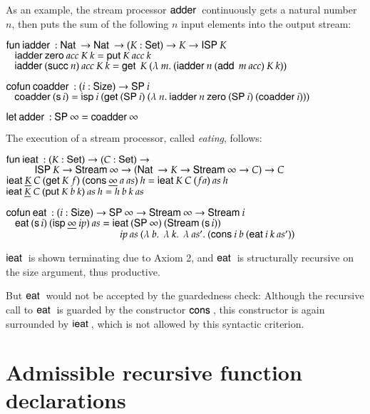 As an example, the stream processor $\mathsf{adder}\:$ continuously gets a natural number $n$, 
then puts the sum of the following $n$ input elements into the output stream:
\begin{bsp}
$\mathsf{fun}\: \mathsf{iadder}\: : \mathsf{Nat}\: \rightarrow \mathsf{Nat}\: \rightarrow (K : \mathsf{Set} ) \rightarrow K \rightarrow \mathsf{ISP}\: K$\\
$\hspace*{3mm} \mathsf{iadder}\: \mathsf{zero}\: acc \: K \: k = \mathsf{put}\: K \: acc \: k$\\
$\hspace*{3mm} \mathsf{iadder}\: (\mathsf{succ}\: n) \: acc \: K \: k = \mathsf{get}\: \: K \: (\lambda\: m .\: (\mathsf{iadder}\: n \: (\mathsf{add}\: \: m \: acc) \: K \: k))$

$\mathsf{cofun}\: \mathsf{coadder}\: : (i : \mathsf{Size} ) \rightarrow \mathsf{SP}\: i$\\
$\hspace*{3mm} \mathsf{coadder}\: (\mathsf{s}\, i) = \mathsf{isp}\: i \: (\mathsf{get}\: (\mathsf{SP}\: i) \: (\lambda\: n .\: \mathsf{iadder}\: n \: \mathsf{zero}\: (\mathsf{SP}\: i) \: (\mathsf{coadder}\: i)))$

$\mathsf{let}\: \mathsf{adder}\: : \mathsf{SP}\: \infty = \mathsf{coadder}\: \infty$
\end{bsp}
\noindent The execution of a stream processor, called \emph{eating}, follows:
\begin{bsp}
$\mathsf{fun}\: \mathsf{ieat}\: : (K : \mathsf{Set}) \rightarrow (C : \mathsf{Set}) \rightarrow $\\
$ \spcx \ispd K \ra \SStream \infty \ra (\Nat \ra K \ra \SStream \infty \ra C) \ra C$ \\
$ \mathsf{ieat}\: \underline{K} \: C \: (\mathsf{get}\: K \: f) \: (\mathsf{cons}\: \underline{\infty} \: a \: as) \: h = \mathsf{ieat}\: K \: C \: (f a) \: as \: h $ \\
$ \mathsf{ieat}\: \underline{K} \: C \: (\mathsf{put}\: K \: b \:k) \: as  \: h = h \: b \: k \: as $

$\mathsf{cofun}\: \mathsf{eat}\: : (i : \mathsf{Size}) \rightarrow \mathsf{SP}\: \infty \rightarrow \mathsf{Stream}\: \infty \rightarrow \mathsf{Stream}\: i$\\
$\hspace*{3mm} \mathsf{eat}\: (\mathsf{s}\, i) \: (\mathsf{isp}\: \underline{\infty} \: ip) \: as = \mathsf{ieat}\: (\mathsf{SP}\: \infty) \: (\mathsf{Stream}\: (\mathsf{s}\, i))$\\
$\spcx \spcx \spcx  \spcx ip \: as \: (\lam{b} \: \lam{k} \: \lam{as'} (\cons i \: b \: (\eat i \: k \: as'))$   
\end{bsp}
\noindent $\mathsf{ieat}\:$ is shown terminating due to Axiom 2, and $\mathsf{eat}\:$ is structurally recursive on the size argument, thus productive.

But $\mathsf{eat}\:$ would not be accepted by the guardedness check: Although the recursive call to $\mathsf{eat}\:$ is guarded by the constructor $\mathsf{cons}\:$, this constructor is again surrounded by $\mathsf{ieat}\:$, which is not allowed by this syntactic criterion.

\section{Admissible recursive function declarations}


